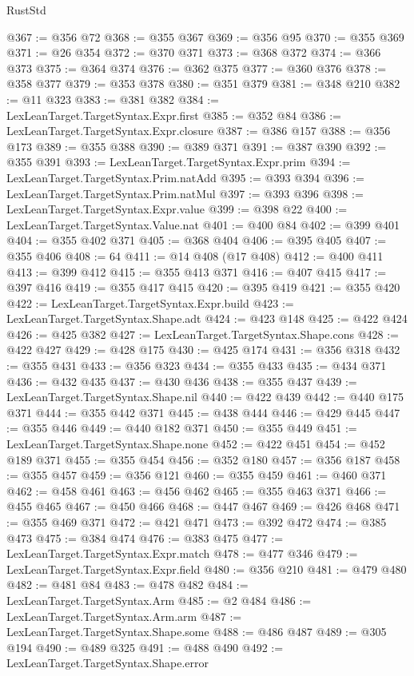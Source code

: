 \begin{lexlean}{RustStd}
\begin{coremodule}
@367 := @356 @72
@368 := @355 @367
@369 := @356 @95
@370 := @355 @369
@371 := @26 @354
@372 := @370 @371
@373 := @368 @372
@374 := @366 @373
@375 := @364 @374
@376 := @362 @375
@377 := @360 @376
@378 := @358 @377
@379 := @353 @378
@380 := @351 @379
@381 := @348 @210
@382 := @11 @323
@383 := @381 @382
@384 := LexLeanTarget.TargetSyntax.Expr.first
@385 := @352 @84
@386 := LexLeanTarget.TargetSyntax.Expr.closure
@387 := @386 @157
@388 := @356 @173
@389 := @355 @388
@390 := @389 @371
@391 := @387 @390
@392 := @355 @391
@393 := LexLeanTarget.TargetSyntax.Expr.prim
@394 := LexLeanTarget.TargetSyntax.Prim.natAdd
@395 := @393 @394
@396 := LexLeanTarget.TargetSyntax.Prim.natMul
@397 := @393 @396
@398 := LexLeanTarget.TargetSyntax.Expr.value
@399 := @398 @22
@400 := LexLeanTarget.TargetSyntax.Value.nat
@401 := @400 @84
@402 := @399 @401
@404 := @355 @402 @371
@405 := @368 @404
@406 := @395 @405
@407 := @355 @406
@408 := 64
@411 := @14 @408 (@17 @408)
@412 := @400 @411
@413 := @399 @412
@415 := @355 @413 @371
@416 := @407 @415
@417 := @397 @416
@419 := @355 @417 @415
@420 := @395 @419
@421 := @355 @420
@422 := LexLeanTarget.TargetSyntax.Expr.build
@423 := LexLeanTarget.TargetSyntax.Shape.adt
@424 := @423 @148
@425 := @422 @424
@426 := @425 @382
@427 := LexLeanTarget.TargetSyntax.Shape.cons
@428 := @422 @427
@429 := @428 @175
@430 := @425 @174
@431 := @356 @318
@432 := @355 @431
@433 := @356 @323
@434 := @355 @433
@435 := @434 @371
@436 := @432 @435
@437 := @430 @436
@438 := @355 @437
@439 := LexLeanTarget.TargetSyntax.Shape.nil
@440 := @422 @439
@442 := @440 @175 @371
@444 := @355 @442 @371
@445 := @438 @444
@446 := @429 @445
@447 := @355 @446
@449 := @440 @182 @371
@450 := @355 @449
@451 := LexLeanTarget.TargetSyntax.Shape.none
@452 := @422 @451
@454 := @452 @189 @371
@455 := @355 @454
@456 := @352 @180
@457 := @356 @187
@458 := @355 @457
@459 := @356 @121
@460 := @355 @459
@461 := @460 @371
@462 := @458 @461
@463 := @456 @462
@465 := @355 @463 @371
@466 := @455 @465
@467 := @450 @466
@468 := @447 @467
@469 := @426 @468
@471 := @355 @469 @371
@472 := @421 @471
@473 := @392 @472
@474 := @385 @473
@475 := @384 @474
@476 := @383 @475
@477 := LexLeanTarget.TargetSyntax.Expr.match
@478 := @477 @346
@479 := LexLeanTarget.TargetSyntax.Expr.field
@480 := @356 @210
@481 := @479 @480
@482 := @481 @84
@483 := @478 @482
@484 := LexLeanTarget.TargetSyntax.Arm
@485 := @2 @484
@486 := LexLeanTarget.TargetSyntax.Arm.arm
@487 := LexLeanTarget.TargetSyntax.Shape.some
@488 := @486 @487
@489 := @305 @194
@490 := @489 @325
@491 := @488 @490
@492 := LexLeanTarget.TargetSyntax.Shape.error

\end{coremodule}
\end{lexlean}
